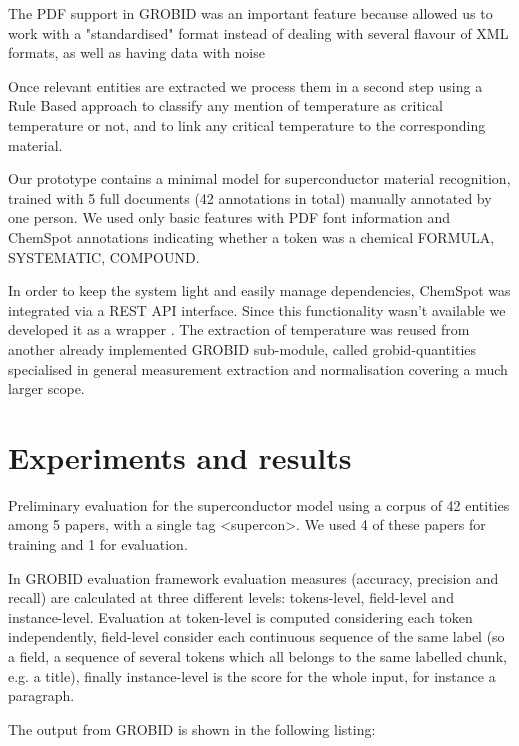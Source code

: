 \documentclass{article}
\begin{document}
The PDF support in GROBID was an important feature because allowed us to work with a "standardised" format instead of dealing with several flavour of XML formats, as well as having data with noise 

Once relevant entities are extracted we process them in a second step using a Rule Based approach to classify any mention of temperature as critical temperature or not, and to link any critical temperature to the corresponding material. 

Our prototype contains a minimal model for superconductor material recognition, trained with 5 full documents (42 annotations in total) manually annotated by one person. We used only basic features with PDF font information and ChemSpot \cite{10.1093/bioinformatics/bts183} annotations indicating whether a token was a chemical FORMULA, SYSTEMATIC, COMPOUND. 

In order to keep the system light and easily manage dependencies, ChemSpot was integrated via a REST API interface. Since this functionality wasn't available we developed it as a wrapper \cite{chemspot-web}.    
The extraction of temperature was reused from another already implemented GROBID sub-module, called grobid-quantities\cite{grobid-quantities} specialised in general measurement extraction and normalisation covering a much larger scope. 

\section{Experiments and results}
\label{sec:experiments-results}

Preliminary evaluation for the superconductor model using a corpus of 42 entities among 5 papers, with a single tag \textless supercon\textgreater. We used 4 of these papers for training and 1 for evaluation. 

In GROBID evaluation framework evaluation measures (accuracy, precision and recall) are calculated at three different levels: tokens-level, field-level and instance-level. 
Evaluation at token-level is computed considering each token independently, field-level consider each continuous sequence of the same label (so a field, a sequence of several tokens which all belongs to the same labelled chunk, e.g. a title), finally instance-level is the score for the whole input, for instance a paragraph.

The output from GROBID is shown in the following listing: 
\end{document}
